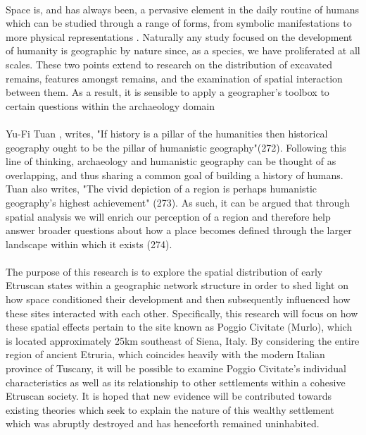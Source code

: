 \documentclass[12pt,a4paper]{thesis}
\begin{document}
\paragraph{}
Space is, and has always been, a pervasive  element in the daily routine of humans which can be studied through a range of forms, from symbolic manifestations to more physical representations \cite[p. 282]{Harvey06}. Naturally any study focused on the development of humanity is geographic by nature since, as a species, we have proliferated at all scales. These two points extend  to research on the distribution of excavated remains, features amongst remains, and the examination of spatial interaction between them. As a result, it is sensible to apply a geographer's toolbox to certain questions within the archaeology domain \cite[p. 39-42]{Kantner08}

\paragraph{}
Yu-Fi Tuan \citeyear{Tuan76}, writes, "If history is a pillar of the humanities then historical geography ought to be the pillar of humanistic geography"(272). Following this line of thinking, archaeology and humanistic geography can be thought of as overlapping, and thus sharing a common goal of building a history of humans. Tuan also writes, "The vivid depiction of a region is perhaps humanistic geography's highest achievement" (273). As such, it can be argued that through spatial analysis we will enrich our perception of a region and therefore help answer broader questions about how a place becomes defined through the larger landscape within which it exists (274).

\paragraph{} 
The purpose of this research is to explore the spatial distribution of early Etruscan states within a geographic network structure in order to shed light on how space conditioned their development  and then subsequently influenced how these sites interacted with each other. Specifically, this research will focus on how these spatial effects  pertain to the site known as Poggio Civitate (Murlo), which is located approximately 25km southeast of Siena, Italy. By considering the entire region of ancient Etruria, which coincides heavily with the modern Italian province of Tuscany, it will be possible to examine Poggio Civitate's individual characteristics as well as its relationship to other settlements within a cohesive Etruscan society. It is hoped that new evidence will be contributed towards existing theories which seek to explain the nature of this wealthy settlement which was abruptly destroyed and has henceforth remained uninhabited.
\end{document}
